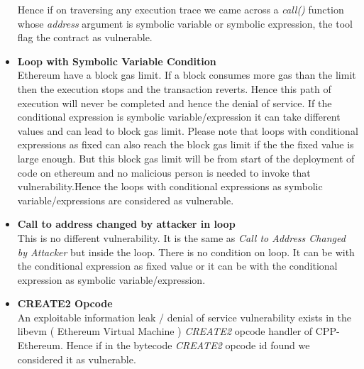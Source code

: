 \begin{itemize}
\begin{itemize}
        \end{itemize}
        Hence if on traversing any execution trace we came across a \emph{call()} function whose \emph{address} argument is symbolic variable or symbolic expression, the tool flag the contract as vulnerable.
    \item \textbf{Loop with Symbolic Variable Condition}\\
    Ethereum have a block gas limit. If a block consumes more gas than the limit then the execution stops and the transaction reverts. Hence this path of execution will never be completed and hence the denial of service. If the conditional expression is symbolic variable/expression it can take different values and can lead to block gas limit. Please note that loops with conditional expressions as fixed can also reach the block gas limit if the the fixed value is large enough. But this block gas limit will be from start of the deployment of code on ethereum and no malicious person is needed to invoke that vulnerability.Hence the loops with conditional expressions as symbolic variable/expressions are considered as vulnerable.
    
    \item \textbf{Call to address changed by attacker in loop}\\
    This is no different vulnerability. It is the same as \emph{Call to Address Changed by Attacker} but inside the loop. There is no condition on loop. It can be with the conditional expression as fixed value or it can be with the conditional expression as symbolic variable/expression.
    \item \textbf{CREATE2 Opcode}\\
    An exploitable information leak / denial of service vulnerability exists in the libevm ( Ethereum Virtual Machine ) \emph{CREATE2} opcode handler of CPP-Ethereum. Hence if in the bytecode \emph{CREATE2} opcode id found we considered it as vulnerable.
\end{itemize}
